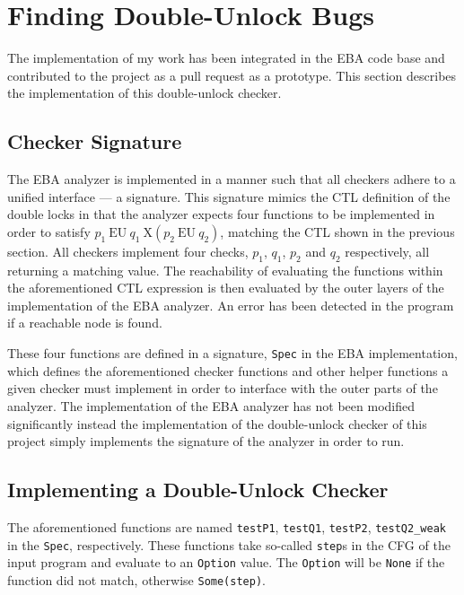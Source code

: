 \section{Finding Double-Unlock Bugs}

\newpar The implementation of my work has been integrated in the EBA code base and contributed to the project as a pull request as a prototype. This section describes the implementation of this double-unlock checker.

\subsection{Checker Signature}

\newpar The EBA analyzer is implemented in a manner such that all checkers adhere to a unified interface --- a signature. This signature mimics the CTL definition of the double locks in that the analyzer expects four functions to be implemented in order to satisfy $p_1\:\mathrm{EU}\:q_1\:\mathrm{X}(p_2\:\mathrm{EU}\:q_2)$, matching the CTL shown in the previous section. All checkers implement four checks, $p_1$, $q_1$, $p_2$ and $q_2$ respectively, all returning a matching value. The reachability of evaluating the functions within the aforementioned CTL expression is then evaluated by the outer layers of the implementation of the EBA analyzer. An error has been detected in the program if a reachable node is found. 

\newpar These four functions are defined in a signature, \texttt{Spec} in the EBA implementation, which defines the aforementioned checker functions and other helper functions a given checker must implement in order to interface with the outer parts of the analyzer. The implementation of the EBA analyzer has not been modified significantly instead the implementation of the double-unlock checker of this project simply implements the signature of the analyzer in order to run. 

\subsection{Implementing a Double-Unlock Checker}

\newpar The aforementioned functions are named \texttt{testP1}, \texttt{testQ1}, \texttt{testP2}, \texttt{testQ2\_weak} in the \texttt{Spec}, respectively. These functions take so-called \texttt{step}s in the CFG of the input program and evaluate to an \texttt{Option} value. The \texttt{Option} will be \texttt{None} if the function did not match, otherwise \texttt{Some(step)}. 

